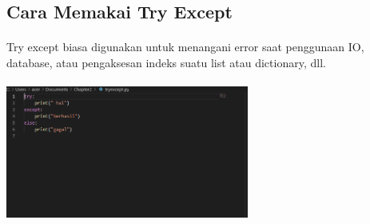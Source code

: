 \documentclass{article}
\begin{document}
\subsection{Cara Memakai Try Except}
\paragraph{}
        Try except biasa digunakan untuk menangani error saat penggunaan IO, database, atau pengaksesan indeks suatu list atau dictionary, dll.
       \paragraph{}
        \centerline{\includegraphics[width=8cm]{figure/F1.PNG}}
\end{document}

